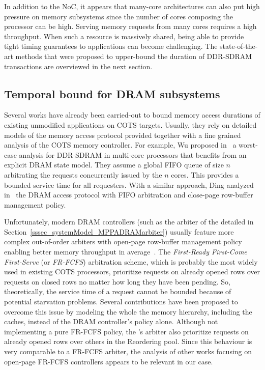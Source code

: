 \documentclass[main.tex]{subfiles}
\begin{document}
In addition to the NoC, it appears that many-core architectures can also put high pressure on memory subsystems since the number of cores composing the processor can be high. Serving memory requests from many cores requires a high throughput. When such a resource is massively shared, being able to provide tight timing guarantees to applications can become challenging. The state-of-the-art methods that were proposed to upper-bound the duration of DDR-SDRAM transactions are overviewed in the next section.  



\subsection{Temporal bound for DRAM subsystems}
Several works have already been carried-out to bound memory access durations of existing unmodified applications on COTS targets. Usually, they rely on detailed models of the memory access protocol provided together with a fine grained analysis of the COTS memory controller. For example, Wu \etal proposed in~\cite{Wu2013} a worst-case analysis for DDR-SDRAM in multi-core processors that benefits from an explicit DRAM state model. They assume a global FIFO queue of size $n$ arbitrating the requests concurrently issued by the $n$ cores. This provides a bounded service time for all requesters. With a similar approach, Ding \etal analyzed in~\cite{ding2013} the DRAM access protocol with FIFO arbitration and close-page row-buffer management policy. 

Unfortunately, modern DRAM controllers (such as the arbiter of the \mppalong detailed in Section~\ref{sssec_systemModel_MPPADRAMarbiter}) usually feature more complex out-of-order arbiters with open-page row-buffer management policy enabling better memory throughput in average~\cite{Rixner2000}. The \emph{First-Ready First-Come First-Serve} (or \emph{FR-FCFS}) arbitration scheme, which is probably the most widely used in existing COTS processors, prioritize requests on already opened rows over requests on closed rows no matter how long they have been pending. So, theoretically, the service time of a request cannot be bounded because of potential starvation problems. Several contributions have been proposed to overcome this issue by modeling the whole the memory hierarchy, including the caches, instead of the DRAM controller's policy alone. Although not implementing a pure FR-FCFS policy, the \mppalong's arbiter also prioritize requests on already opened rows over others in the Reordering pool. Since this behaviour is very comparable to a FR-FCFS arbiter, the analysis of other works focusing on open-page FR-FCFS controllers appears to be relevant in our case.\\
\end{document}
